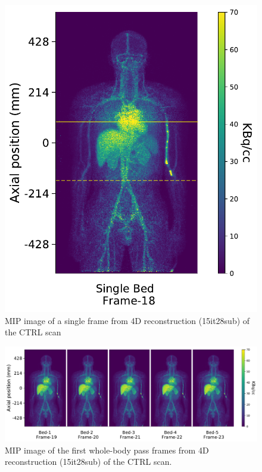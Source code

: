 \begin{figure} [h!]
\centering
\includegraphics[scale=0.52,angle=0]{3_Results/3_3_DWB_Reconstruction/figures/3_3_IsotoPK_CTRL_DSB_4D.pdf}
\caption{MIP image of a single frame from 4D reconstruction (15it28sub) of the CTRL scan}
\label{fig_3_3:IsotoPK_CTRL_DSB_4D}
\end{figure} 

\begin{figure} [h!]
\centering
\includegraphics[scale=0.52,angle=0]{3_Results/3_3_DWB_Reconstruction/figures/3_3_IsotoPK_CTRL_DWB_4D.pdf}
\caption{MIP image of the first whole-body pass frames from 4D reconstruction (15it28sub) of the CTRL scan.}
\label{fig_3_3:IsotoPK_CTRL_DWB_4D}
\end{figure} 


